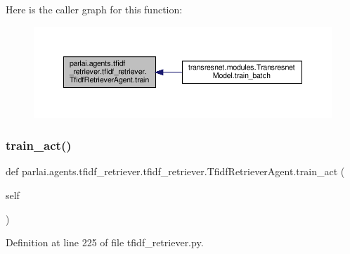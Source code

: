 Here is the caller graph for this function\+:
\nopagebreak
\begin{figure}[H]
\begin{center}
\leavevmode
\includegraphics[width=350pt]{classparlai_1_1agents_1_1tfidf__retriever_1_1tfidf__retriever_1_1TfidfRetrieverAgent_abc3ce26084466682f25980e176d3ce38_icgraph}
\end{center}
\end{figure}
\mbox{\label{classparlai_1_1agents_1_1tfidf__retriever_1_1tfidf__retriever_1_1TfidfRetrieverAgent_a424c899b5755606c32c7d6a85989ce92}} 
\subsubsection{\texorpdfstring{train\+\_\+act()}{train\_act()}}
{\footnotesize\ttfamily def parlai.\+agents.\+tfidf\+\_\+retriever.\+tfidf\+\_\+retriever.\+Tfidf\+Retriever\+Agent.\+train\+\_\+act (\begin{DoxyParamCaption}\item[{}]{self }\end{DoxyParamCaption})}



Definition at line 225 of file tfidf\+\_\+retriever.\+py.




